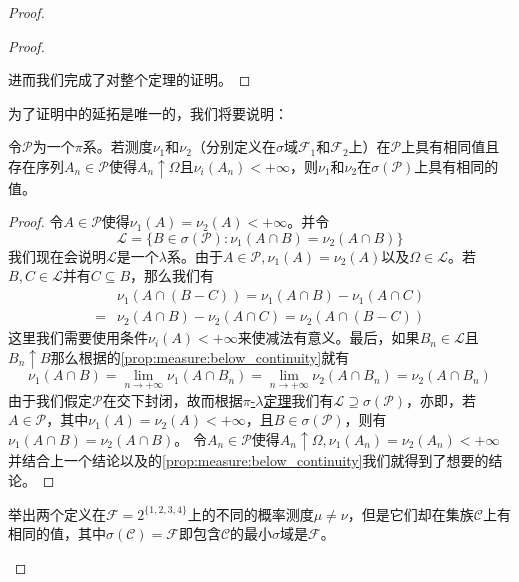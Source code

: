 \documentclass[main.tex]{subfiles}
\begin{document}
\begin{proof}
\begin{proof}
\begin{enumerate}[label=(\alph*)]
		\end{enumerate}
		进而我们完成了对整个定理的证明。
	\end{proof}
	为了证明中的延拓是唯一的，我们将要说明：
	\begin{theorem} \label{thm:a.1.5}
		令\(\mathcal{P}\)为一个\(\pi\)系。若测度\(\nu_1\)和\(\nu_2\)（分别定义在\(\sigma\)域\(\mathcal{F}_1\)和\(\mathcal{F}_2\)上）在\(\mathcal{P}\)上具有相同值且存在序列\(A_n \in \mathcal{P}\)使得\(A_n \uparrow \Omega\)且\(\nu_i(A_n)<+\infty\)，则\(\nu_1\)和\(\nu_2\)在\(\sigma(\mathcal{P})\)上具有相同的值。
	\end{theorem}
	\begin{proof}
		令\(A \in \mathcal{P}\)使得\(\nu_1(A) = \nu_2(A) < +\infty\)。并令
		\[\mathcal{L} = \{B \in \sigma(\mathcal{P}):\nu_1(A\cap B) = \nu_2(A\cap B)\}\]
		我们现在会说明\(\mathcal{L}\)是一个\(\lambda\)系。由于\(A\in \mathcal{P}, \nu_1(A) = \nu_2(A)\)以及\(\Omega \in \mathcal{L}\)。若\(B,C \in \mathcal{L}\)并有\(C \subseteq B\)，那么我们有
		\[\begin{split}
			&\nu_1(A\cap(B-C)) = \nu_1(A\cap B) - \nu_1(A\cap C)\\
			=&\nu_2(A\cap B) - \nu_2(A\cap C)=\nu_2(A\cap(B-C))
		\end{split}\]
		这里我们需要使用条件\(\nu_i(A) < +\infty\)来使减法有意义。最后，如果\(B_n \in \mathcal{L}\)且\(B_n \uparrow B\)那么根据的\ref{prop:measure:below_continuity}就有
		\[\nu_1(A\cap B) = \lim\limits_{n\rightarrow+\infty}\nu_1(A\cap B_n)=\lim\limits_{n\rightarrow+\infty}\nu_2(A\cap B_n)=\nu_2(A\cap B_n)\]
		由于我们假定\(\mathcal{P}\)在交下封闭，故而根据\hyperref[thm:a.1.4]{\(\pi\)-\(\lambda\)定理}我们有\(\mathcal{L}\supseteq\sigma(\mathcal{P})\)，亦即，若\(A \in \mathcal{P}\)，其中\(\nu_1(A)=\nu_2(A)<+\infty\)，且\(B\in\sigma(\mathcal{P})\)，则有\(\nu_1(A\cap B) = \nu_2(A\cap B)\)。
		令\(A_n \in \mathcal{P}\)使得\(A_n\uparrow\Omega, \nu_1(A_n) = \nu_2(A_n)<+\infty\)并结合上一个结论以及的\ref{prop:measure:below_continuity}我们就得到了想要的结论。
	\end{proof}
	\begin{exercise}
		\item 举出两个定义在\(\mathcal{F} =2^{\{1,2,3,4\}} \)上的不同的概率测度\(\mu\neq\nu\)，但是它们却在集族\(\mathcal{C}\)上有相同的值，其中\(\sigma(\mathcal{C}) = \mathcal{F}\)即包含\(\mathcal{C}\)的最小\(\sigma\)域是\(\mathcal{F}\)。
	\end{exercise}


\end{proof}
\end{document}
